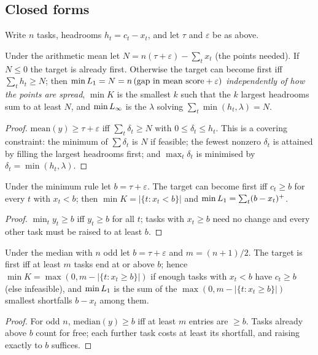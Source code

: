 \subsection{Closed forms}
\label{sec:theory}
Write $n$ tasks, headrooms $h_t=c_t-x_t$, and let $\tau$ and $\varepsilon$ be as above.

\begin{proposition}[Mean]\label{prop:mean}
Under the arithmetic mean let $N=n(\tau+\varepsilon)-\sum_t x_t$ (the points needed). If $N\le0$ the target is already first. Otherwise the target can become first iff $\sum_t h_t\ge N$; then $\min L_1=N=n\,(\text{gap in mean score}+\varepsilon)$ \emph{independently of how the points are spread}, $\min K$ is the smallest $k$ such that the $k$ largest headrooms sum to at least $N$, and $\min L_\infty$ is the $\lambda$ solving $\sum_t\min(h_t,\lambda)=N$.
\end{proposition}
\begin{proof}
$\mathrm{mean}(y)\ge\tau+\varepsilon$ iff $\sum_t\delta_t\ge N$ with $0\le\delta_t\le h_t$. This is a covering constraint: the minimum of $\sum\delta_t$ is $N$ if feasible; the fewest nonzero $\delta_t$ is attained by filling the largest headrooms first; and $\max_t\delta_t$ is minimised by $\delta_t=\min(h_t,\lambda)$.
\end{proof}

\begin{proposition}[Minimum]\label{prop:min}
Under the minimum rule let $b=\tau+\varepsilon$. The target can become first iff $c_t\ge b$ for every $t$ with $x_t<b$; then $\min K=|\{t:x_t<b\}|$ and $\min L_1=\sum_t(b-x_t)^+$.
\end{proposition}
\begin{proof}
$\min_t y_t\ge b$ iff $y_t\ge b$ for all $t$; tasks with $x_t\ge b$ need no change and every other task must be raised to at least $b$.
\end{proof}

\begin{proposition}\label{prop:median}
Under the median with $n$ odd let $b=\tau+\varepsilon$ and $m=(n+1)/2$. The target is first iff at least $m$ tasks end at or above $b$; hence $\min K=\max(0,m-|\{t:x_t\ge b\}|)$ if enough tasks with $x_t<b$ have $c_t\ge b$ (else infeasible), and $\min L_1$ is the sum of the $\max(0, m-|\{t:x_t\ge b\}|)$ smallest shortfalls $b-x_t$ among them.
\end{proposition}
\begin{proof}
For odd $n$, $\mathrm{median}(y)\ge b$ iff at least $m$ entries are $\ge b$. Tasks already above $b$ count for free; each further task costs at least its shortfall, and raising exactly to $b$ suffices.
\end{proof}

